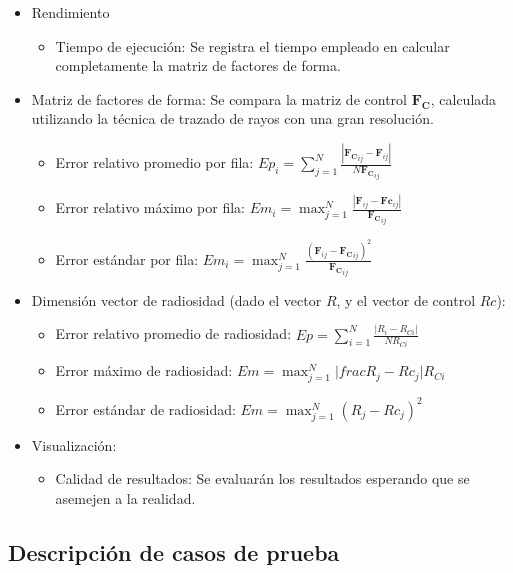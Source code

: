 \begin{itemize}
	\item Rendimiento
		\begin{itemize}
			\item Tiempo de ejecución: Se registra el tiempo empleado en calcular completamente la matriz de factores de forma.
		\end{itemize}
	\item Matriz de factores de forma: Se compara la matriz de control $\mathbf{F_{C}}$, calculada utilizando la técnica de trazado de rayos con una gran resolución.
		\begin{itemize}
			\item Error relativo promedio por fila: $Ep_{i} = \sum_{j=1}^{N} \frac{|\mathbf{F_{C}}_{ij} -\mathbf{F}_{ij}|}{N \mathbf{F_{C}}_{ij}}$
			\item Error relativo máximo por fila: $Em_{i} = \max_{j=1}^{N}\frac{|\mathbf{F}_{ij} -\mathbf{Fc}_{ij}|}{\mathbf{F_{C}}_{ij}}$
			\item Error estándar por fila: $Em_{i} = \max_{j=1}^{N}\frac{(\mathbf{F}_{ij} -\mathbf{F_{C}}_{ij})^{2}}{\mathbf{F_{C}}_{ij}}$
		\end{itemize}
	\item Dimensión vector de radiosidad (dado el vector $R$, y el vector de control $Rc$):
	\begin{itemize}
		\item Error relativo promedio de radiosidad: $Ep = \sum_{i=1}^{N} \frac{|R_{i}-R_{Ci}|}{N R_{Ci}}$
		\item Error máximo de radiosidad: $Em = \max_{j=1}^{N}|frac{R_{j} -Rc_{j}|}{R_{Ci}}$
		\item Error estándar de radiosidad: $Em = \max_{j=1}^{N}(R_{j} -Rc_{j})^{2}$
	\end{itemize}
\item Visualización:
	\begin{itemize}
		\item Calidad de resultados: Se evaluarán los resultados esperando que se asemejen a la realidad.
	\end{itemize}
\end{itemize}

\subsection{Descripción de casos de prueba}

